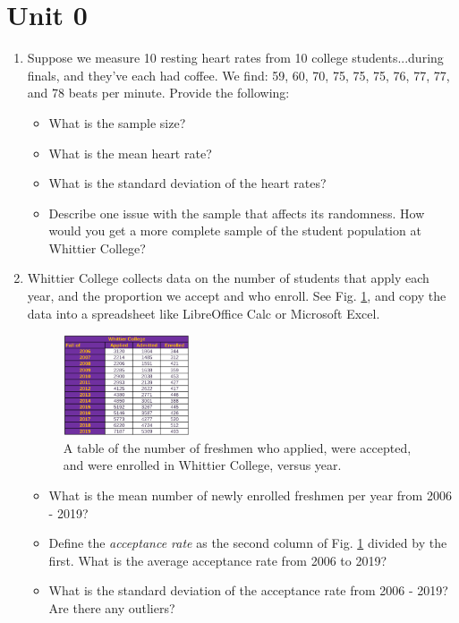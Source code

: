 \documentclass{article}
\begin{document}
\clearpage

\section{Unit 0}

\begin{enumerate}
\item Suppose we measure 10 resting heart rates from 10 college students...during finals, and they've each had coffee.  We find: 59, 60, 70, 75, 75, 75, 76, 77, 77, and 78 beats per minute.  Provide the following:
\begin{itemize}
\item What is the sample size?
\item What is the mean heart rate?
\item What is the standard deviation of the heart rates?
\item Describe one issue with the sample that affects its randomness.  How would you get a more complete sample of the student population at Whittier College?
\end{itemize}
\vspace{1cm}
\item Whittier College collects data on the number of students that apply each year, and the proportion we accept and who enroll.  See Fig. \ref{fig:admit}, and copy the data into a spreadsheet like LibreOffice Calc or Microsoft Excel.
\begin{figure}[ht]
\centering
\includegraphics[width=0.35\textwidth]{figures/admit.png}
\caption{\label{fig:admit} A table of the number of freshmen who applied, were accepted, and were enrolled in Whittier College, versus year.}
\end{figure}
\begin{itemize}
\item What is the mean number of newly enrolled freshmen per year from 2006 - 2019?
\item Define the \textit{acceptance rate} as the second column of Fig. \ref{fig:admit} divided by the first.  What is the average acceptance rate from 2006 to 2019?
\item What is the standard deviation of the acceptance rate from 2006 - 2019?  Are there any outliers?

\end{itemize}
\end{enumerate}
\end{document}
